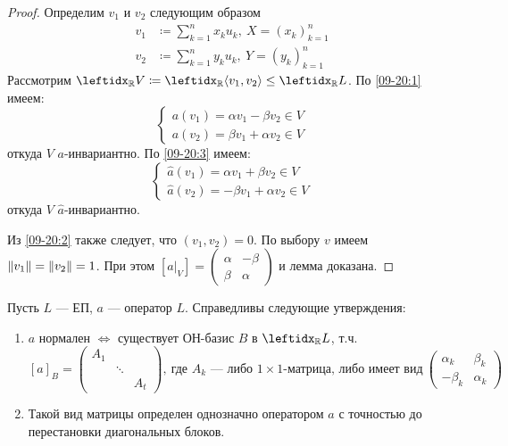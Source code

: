 \begin{proof}
    Определим $v_1$ и $v_2$ следующим образом
    \begin{align*}
        v_1 &\coloneqq \sum_{k=1}^n x_k u_k,\ X = (x_k)_{k=1}^n \\
        v_2 &\coloneqq \sum_{k=1}^n y_k u_k,\ Y = (y_k)_{k=1}^n
    \end{align*}
    Рассмотрим $\lsub{\mathbb{R}}{V} \coloneqq \gen{\mathbb{R}}{v_1, v_2} \le \lsub{\mathbb{R}}{L}$. По \eqref{09-20:1} имеем:
    $$\begin{cases}
        a(v_1) = \alpha v_1 - \beta v_2 \in V \\
        a(v_2) = \beta v_1 + \alpha v_2 \in V
    \end{cases}$$
    откуда $V$ $a$-инвариантно. По \eqref{09-20:3} имеем:
    $$\begin{cases}
        \hat{a}(v_1) = \alpha v_1 + \beta v_2 \in V \\
        \hat{a}(v_2) = -\beta v_1 + \alpha v_2 \in V
    \end{cases}$$
    откуда $V$ $\hat{a}$-инвариантно.
    
    Из \eqref{09-20:2} также следует, что $(v_1, v_2) = 0$. По выбору $v$ имеем $\left\lVert v_1\right\rVert = \left\lVert v_2\right\rVert = 1$. При этом $[a\vert_V] = \begin{pmatrix}
        \alpha & -\beta \\
        \beta & \alpha
    \end{pmatrix}$ и лемма доказана.
\end{proof}

\begin{thm*}
    Пусть $L$ --- ЕП, $a$ --- оператор $L$. Справедливы следующие утверждения:
    \begin{enumerate}
        \item $a$ нормален $\Leftrightarrow$ существует ОН-базис $B$ в $\lsub{\mathbb{R}}{L}$, т.ч.
        \begin{equation}\label{09-20:star}\tag{$*$}
            [a]_B = \begin{pmatrix}
                A_1 &        & \\
                    & \ddots & \\
                    &        & A_t
            \end{pmatrix},\
            \text{где $A_k$ --- либо $1 \times 1$-матрица, либо имеет вид}\
            \begin{pmatrix}
                \alpha_k & \beta_k \\
                -\beta_k & \alpha_k
            \end{pmatrix}
        \end{equation}
        \item Такой вид матрицы определен однозначно оператором $a$ с точностью до перестановки диагональных блоков.
    \end{enumerate}
\end{thm*}

